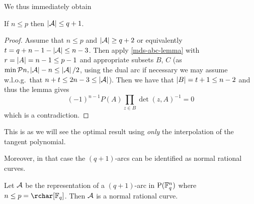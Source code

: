 We thus immediately obtain

\begin{corollary}\label{mds-bound-n-leq-p}
  If $n\leq p$ then $\left|\mathcal{A}\right|\leq q+1$.
\end{corollary}

\begin{proof}
  Assume that $n\leq p$ and $\left|\mathcal{A}\right|\geq q+2$ or equivalently $t=q+n-1-\left|\mathcal{A}\right|\leq
  n-3$. Then apply \autoref{mds-abc-lemma} with
  $r=\left|A\right|=n-1\leq p-1$ and appropriate subsets $B$, $C$ (as $\min\set{n,\card{\cA}-n}\leq\card{\cA}/2$, using the dual arc  if necessary we may assume w.l.o.g.\ that $n+t\leq 2n-3\leq\left|\mathcal{A}\right|$). Then
  we have that $\left|B\right|=t+1\leq n-2$ and thus the lemma gives
  $$
    {(-1)}^{n-1}P(A)\prod_{z\in B}{{\det(z,A)}^{-1}}=0
  $$
  which is a contradiction.
\end{proof}

\begin{remark}
    This is as we will see the optimal result using \emph{only} the interpolation
    of the tangent polynomial.
\end{remark}

Moreover, in that case the $(q+1)$-arcs can be identified as normal rational
curves.

\begin{corollary}\label{mds-class-n-leq-p}
    Let $\mathcal{A}$ be the representation of a $(q+1)$-arc in $\P(\field{q}^n)$ where $n\leq
    p=\rchar[\field{q}]$. Then $\mathcal{A}$ is a normal rational curve.
\end{corollary}

